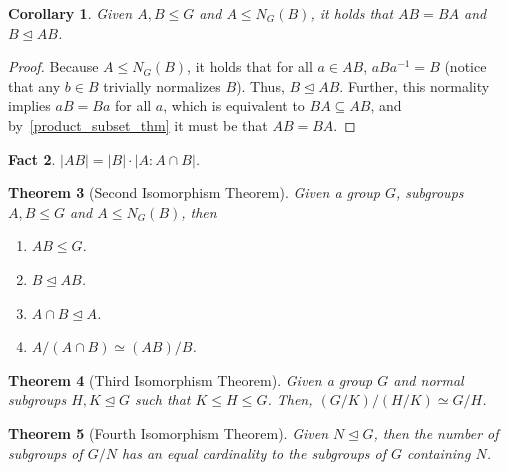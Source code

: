 \documentclass[a4paper,12pt]{article}
\theoremstyle{sltheorem}
\newtheorem{theorem}{Theorem}[section]
\newtheorem{corollary}[theorem]{Corollary}
\newtheorem{fact}[theorem]{Fact}
\begin{document}
\begin{corollary}
    Given $A, B \leq G$ and $A \leq N_G(B)$, it holds that $AB = BA$ and $B \trianglelefteq AB$.
\end{corollary}

\begin{proof}
    Because $A \leq N_G(B)$, it holds that for all $a \in AB$, $aBa^{-1} = B$ (notice that any $b \in B$ trivially normalizes $B$). Thus, $B \trianglelefteq AB$. Further, this normality implies $aB = Ba$ for all $a$, which is equivalent to $BA \subseteq AB$, and by~\ref{product_subset_thm} it must be that $AB = BA$.
\end{proof}

\begin{fact}
    $|AB| = |B| \cdot |A : A \cap B|$.
\end{fact}

\begin{theorem}[Second Isomorphism Theorem]
    Given a group $G$, subgroups $A, B \leq G$ and $A \leq N_G(B)$, then \begin{enumerate}
        \item $AB \leq G$.
        \item $B \trianglelefteq AB$.
        \item $A \cap B \trianglelefteq A$.
        \item $A/(A \cap B) \simeq (AB)/B$.
    \end{enumerate}
\end{theorem}

\begin{theorem}[Third Isomorphism Theorem]
    Given a group $G$ and normal subgroups $H, K \trianglelefteq G$ such that $K \leq H \leq G$. Then, $(G/K)/(H/K) \simeq G/H$.
\end{theorem}

\begin{theorem}[Fourth Isomorphism Theorem]
    Given $N \trianglelefteq G$, then the number of subgroups of $G/N$ has an equal cardinality to the subgroups of $G$ containing $N$.
\end{theorem}
\end{document}
